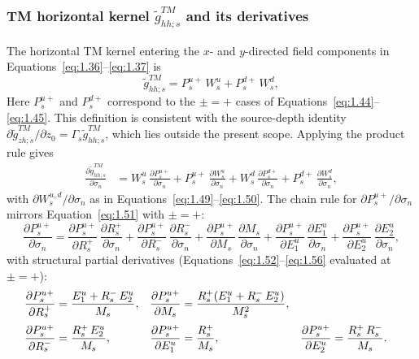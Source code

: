 \documentclass[12pt]{report}
\begin{document}
\subsubsection{TM horizontal kernel \(\tilde{g}^{TM}_{hh;s}\) and its derivatives}
\label{sec:hh_kernel}

The horizontal TM kernel entering the \(x\)- and \(y\)-directed field
components in Equations~\eqref{eq:1.36}--\eqref{eq:1.37} is
\begin{equation}
    \tilde{g}^{TM}_{hh;s} = P_s^{u+}\,W_s^u + P_s^{d+}\,W_s^d,
    \label{eq:1.75}
\end{equation}
Here \(P_s^{u+}\) and \(P_s^{d+}\) correspond to the \(\pm=+\) cases of
Equations~\eqref{eq:1.44}--\eqref{eq:1.45}. This definition is consistent
with the source-depth identity
\(\partial\tilde{g}^{TM}_{zh;s}/\partial z_0=
\Gamma_s\tilde{g}^{TM}_{hh;s}\), which lies outside the present scope.
Applying the product rule gives
\begin{align}
    \frac{\partial\tilde{g}^{TM}_{hh;s}}{\partial\sigma_n}
    &= W_s^u\,\frac{\partial P_s^{u+}}{\partial\sigma_n}
     + P_s^{u+}\,\frac{\partial W_s^u}{\partial\sigma_n}
     + W_s^d\,\frac{\partial P_s^{d+}}{\partial\sigma_n}
     + P_s^{d+}\,\frac{\partial W_s^d}{\partial\sigma_n},
    \label{eq:1.76}
\end{align}
with \(\partial W_s^{u,d}/\partial\sigma_n\) as in
Equations~\eqref{eq:1.49}--\eqref{eq:1.50}. The chain rule for
\(\partial P_s^{u+}/\partial\sigma_n\) mirrors Equation~\eqref{eq:1.51}
with \(\pm=+\):
\begin{equation}
    \frac{\partial P_s^{u+}}{\partial\sigma_n}
    = \frac{\partial P_s^{u+}}{\partial R_s^+}\,\frac{\partial R_s^+}{\partial\sigma_n}
    + \frac{\partial P_s^{u+}}{\partial R_s^-}\,\frac{\partial R_s^-}{\partial\sigma_n}
    + \frac{\partial P_s^{u+}}{\partial M_s}\,\frac{\partial M_s}{\partial\sigma_n}
    + \frac{\partial P_s^{u+}}{\partial E_1^u}\,\frac{\partial E_1^u}{\partial\sigma_n}
    + \frac{\partial P_s^{u+}}{\partial E_2^u}\,\frac{\partial E_2^u}{\partial\sigma_n},
    \label{eq:1.77}
\end{equation}
with structural partial derivatives (Equations~\eqref{eq:1.52}--\eqref{eq:1.56}
evaluated at \(\pm=+\)):
\begin{align}
    \frac{\partial P_s^{u+}}{\partial R_s^+}
    &= \frac{E_1^u + R_s^-\,E_2^u}{M_s}, &
    \frac{\partial P_s^{u+}}{\partial M_s}
    &= \frac{R_s^+\!\left(E_1^u + R_s^-\,E_2^u\right)}{M_s^2}, \notag \\[2pt]
    \frac{\partial P_s^{u+}}{\partial R_s^-}
    &= \frac{R_s^+\,E_2^u}{M_s}, &
    \frac{\partial P_s^{u+}}{\partial E_1^u}
    &= \frac{R_s^+}{M_s}, &
    \frac{\partial P_s^{u+}}{\partial E_2^u}
    &= \frac{R_s^+\,R_s^-}{M_s}.
    \label{eq:1.78}
\end{align}
\end{document}
